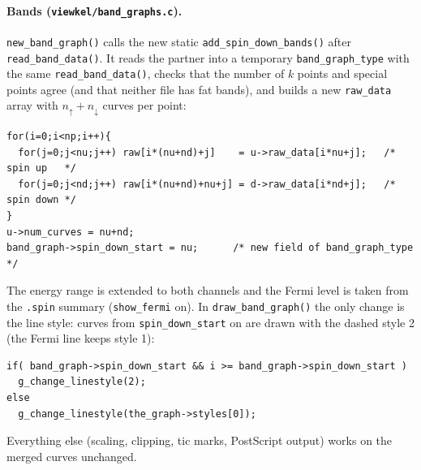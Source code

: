 \documentclass[11pt,a4paper]{article}
\newcommand{\file}[1]{\texttt{#1}}
\newcommand{\fn}[1]{\texttt{#1()}}
\newcommand{\var}[1]{\texttt{#1}}
\begin{document}
\paragraph{Bands (\file{viewkel/band\_graphs.c}).} \fn{new\_band\_graph} calls the new
static \fn{add\_spin\_down\_bands} after \fn{read\_band\_data}. It reads the partner into a
temporary \var{band\_graph\_type} with the same \fn{read\_band\_data}, checks that the
number of $k$ points and special points agree (and that neither file has fat bands),
and builds a new \var{raw\_data} array with $n_\uparrow+n_\downarrow$ curves per point:
\begin{lstlisting}
for(i=0;i<np;i++){
  for(j=0;j<nu;j++) raw[i*(nu+nd)+j]    = u->raw_data[i*nu+j];   /* spin up   */
  for(j=0;j<nd;j++) raw[i*(nu+nd)+nu+j] = d->raw_data[i*nd+j];   /* spin down */
}
u->num_curves = nu+nd;
band_graph->spin_down_start = nu;      /* new field of band_graph_type */
\end{lstlisting}
The energy range is extended to both channels and the Fermi level is taken from the
\texttt{.spin} summary (\var{show\_fermi} on). In \fn{draw\_band\_graph} the only change
is the line style: curves from \var{spin\_down\_start} on are drawn with the dashed style
2 (the Fermi line keeps style 1):
\begin{lstlisting}
if( band_graph->spin_down_start && i >= band_graph->spin_down_start )
  g_change_linestyle(2);
else
  g_change_linestyle(the_graph->styles[0]);
\end{lstlisting}
Everything else (scaling, clipping, tic marks, PostScript output) works on the merged
curves unchanged.
\end{document}
